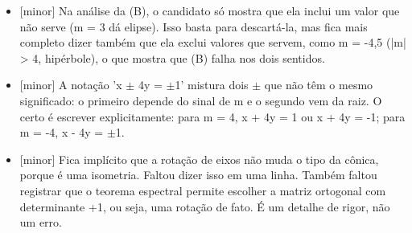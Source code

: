 \documentclass{article}%
\begin{document}
\begin{itemize}%
\item%
{[}minor{]} Na análise da (B), o candidato só mostra que ela inclui um valor que não serve (m = 3 dá elipse). Isso basta para descartá{-}la, mas fica mais completo dizer também que ela exclui valores que servem, como m = -4,5 (|m| > 4, hipérbole), o que mostra que (B) falha nos dois sentidos.%
\item%
{[}minor{]} A notação 'x $\pm$ 4y = $\pm$1' mistura dois $\pm$ que não têm o mesmo significado: o primeiro depende do sinal de m e o segundo vem da raiz. O certo é escrever explicitamente: para m = 4, x + 4y = 1 ou x + 4y = -1; para m = -4, x - 4y = $\pm$1.%
\item%
{[}minor{]} Fica implícito que a rotação de eixos não muda o tipo da cônica, porque é uma isometria. Faltou dizer isso em uma linha. Também faltou registrar que o teorema espectral permite escolher a matriz ortogonal com determinante +1, ou seja, uma rotação de fato. É um detalhe de rigor, não um erro.%
\end{itemize}%
\end{document}

